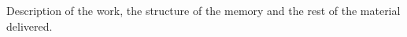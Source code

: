 
\nonzeroparskip Description of the work, the structure of the memory and the rest of the material delivered.
